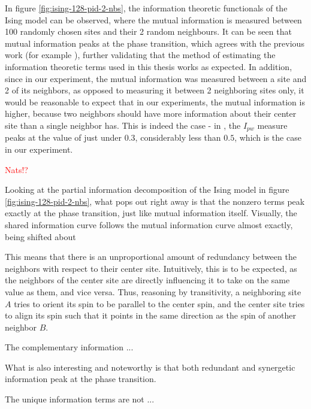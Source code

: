 \documentclass[12pt]{article}
\begin{document}
In figure \ref{fig:ising-128-pid-2-nbs}, the information theoretic functionals of the Ising model can be observed, where the mutual information is measured between 100 randomly chosen sites and their 2 random neighbours. It can be seen that mutual information peaks at the phase transition, which agrees with the previous work (for example \cite{barnett-ising}), further validating that the method of estimating the information theoretic terms used in this thesis works as expected. In addition, since in our experiment, the mutual information was measured between a site and 2 of its neighbors, as opposed to measuring it between 2 neighboring sites only, it would be reasonable to expect that in our experiments, the mutual information is higher, because two neighbors should have more information about their center site than a single neighbor has. This is indeed the case - in \cite{barnett-ising}, the $I_{pw}$ measure peaks at the value of just under $0.3$, considerably less than $0.5$, which is the case in our experiment. 

\textcolor{red}{Nats!?}

Looking at the partial information decomposition of the Ising model in figure \ref{fig:ising-128-pid-2-nbs}, what pops out right away is that the nonzero terms peak exactly at the phase transition, just like mutual information itself. Visually, the shared information curve follows the mutual information curve almost exactly, being shifted about 


This means that there is an unproportional amount of redundancy between the neighbors with respect to their center site. Intuitively, this is to be expected, as the neighbors of the center site are directly influencing it to take on the same value as them, and vice versa. Thus, reasoning by transitivity, a neighboring site $A$ tries to orient its spin to be parallel to the center spin, and the center site tries to align its spin such that it points in the same direction as the spin of another neighbor $B$.

The complementary information ... 

What is also interesting and noteworthy is that both redundant and synergetic information peak at the phase transition. 

The unique information terms are not ... 
\end{document}
